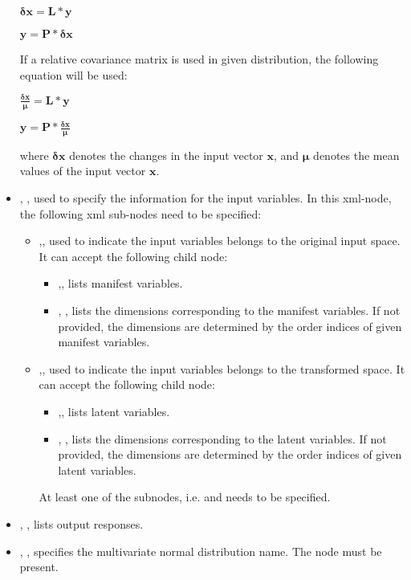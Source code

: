 \begin{itemize}
  $
  \mathbf{\delta x} = \mathbf L * \mathbf y
  $

  $
  \mathbf y = \mathbf P * \mathbf \delta \mathbf x
  $

  If a relative covariance matrix is used in given distribution, the following equation will be used:

  $
  \frac{\mathbf \delta \mathbf x}{\mathbf \mu} = \mathbf L * \mathbf y
  $

  $
  \mathbf y = \mathbf P * {\frac{\mathbf \delta \mathbf x}{\mathbf \mu}}
  $

  where $\mathbf{\delta x}$ denotes the changes in the input vector $\mathbf x$, and $\mathbf \mu$ denotes the mean values of the input vector $\mathbf x$.

  \item {}, , used to specify the information for the input variables.
  In this xml-node, the following xml sub-nodes need to be specified:
    \begin{itemize}
      \item {},, used to indicate the input variables belongs to the original input space.
      It can accept the following child node:
        \begin{itemize}
          \item {},, lists manifest variables.
          \item {}, , lists the dimensions corresponding to the manifest variables.
          If not provided, the dimensions are determined by the order indices of given manifest variables.
        \end{itemize}
      \item {},, used to indicate the input variables belongs to the transformed space.
      It can accept the following child node:
        \begin{itemize}
          \item {},, lists latent variables.
          \item {}, , lists the dimensions corresponding to the latent variables.
          If not provided, the dimensions are determined by the order indices of given latent variables.
        \end{itemize}
      \nb At least one of the subnodes, i.e.  and  needs to be specified.
    \end{itemize}
  \item {}, , lists output responses.
  \item {}, , specifies the
  multivariate normal distribution name. The  node must be present.
\end{itemize}
